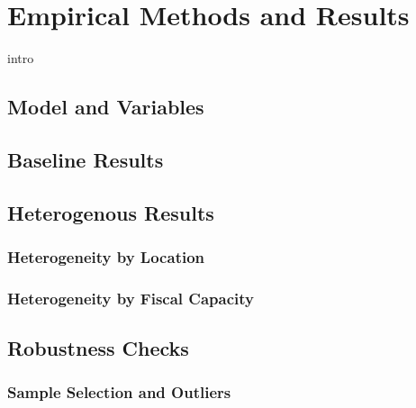 \chapter{Empirical Methods and
Results}\label{empirical-methods-and-results}

intro


\section{Model and Variables}\label{model-and-variables}



\section{Baseline Results}\label{baseline-results}

\section{Heterogenous Results}\label{heterogenous-results}

\subsection{Heterogeneity by Location}\label{heterogeneity-by-location}


\subsection{Heterogeneity by Fiscal
Capacity}\label{heterogeneity-by-fiscal-capacity}






\section{Robustness Checks}\label{robustness-checks}

\subsection{Sample Selection and
Outliers}\label{sample-selection-and-outliers}

